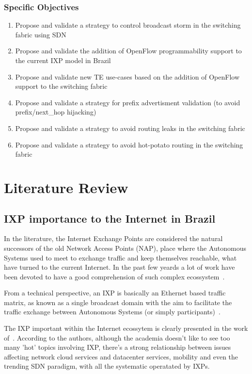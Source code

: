 \subsection{Specific Objectives}
\begin{enumerate}
	\item Propose and validate a strategy to control broadcast storm in the switching fabric using SDN
	\item Propose and validate the addition of OpenFlow programmability support to the current IXP model in Brazil
    \item Propose and validate new TE use-cases based on the addition of OpenFlow support to the switching fabric
    \item Propose and validate a strategy for prefix advertisment validation (to avoid prefix/next\_hop hijacking)
    \item Propose and validate a strategy to avoid routing leaks in the switching fabric
    \item Propose and validate a strategy to avoid hot-potato routing in the switching fabric
\end{enumerate}


\chapter{Literature Review}
\label{chap:literature}
\section{IXP importance to the Internet in Brazil}
In the literature, the Internet Exchange Points are considered the natural successors of the old Network Access Points (NAP), place where the Autonomous Systems used to meet to exchange traffic and keep themselves reachable, what have turned to the current Internet. In the past few yeards a lot of work have been devoted to have a good comprehension of such complex ecossystem~\cite{haddadi2013}.

From a technical perspective, an IXP is basically an Ethernet based traffic matrix, as known as a single broadcast domain with the aim to facilitate the traffic exchange between Autonomous Systems (or simply participants)~\cite{euroix2012}.

The IXP important within the Internet ecossytem is clearly presented in the work of~\cite{chatzis2013importance}. According to the authors, although the academia doesn't like to see too many 'hot' topics involving IXP, there's a strong relationship between issues affecting network cloud services and datacenter services, mobility and even the trending SDN paradigm, with all the systematic operatated by IXPs.


